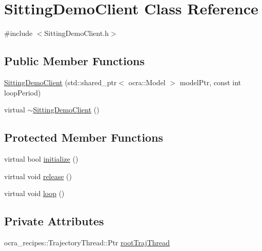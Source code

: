 \hypertarget{classSittingDemoClient}{\section{\-Sitting\-Demo\-Client \-Class \-Reference}
\label{classSittingDemoClient}
}


{\ttfamily \#include $<$\-Sitting\-Demo\-Client.\-h$>$}

\subsection*{\-Public \-Member \-Functions}
\begin{DoxyCompactItemize}
\item 
\hyperlink{classSittingDemoClient_aedcb6c4ad7b4fa19f1b188e700c0a079}{\-Sitting\-Demo\-Client} (std\-::shared\-\_\-ptr$<$ ocra\-::\-Model $>$ model\-Ptr, const int loop\-Period)
\item 
virtual \hyperlink{classSittingDemoClient_a0fb7ded5e44b2b60d7f89c22386154b7}{$\sim$\-Sitting\-Demo\-Client} ()
\end{DoxyCompactItemize}
\subsection*{\-Protected \-Member \-Functions}
\begin{DoxyCompactItemize}
\item 
virtual bool \hyperlink{classSittingDemoClient_aff04405d690f2ae8abbd05ea4b55b64d}{initialize} ()
\item 
virtual void \hyperlink{classSittingDemoClient_a18d30d70a9b17e8f64f87f5cb01b746e}{release} ()
\item 
virtual void \hyperlink{classSittingDemoClient_ad08cf3328c8a4f22a1677b5ad67de645}{loop} ()
\end{DoxyCompactItemize}
\subsection*{\-Private \-Attributes}
\begin{DoxyCompactItemize}
\item 
ocra\-\_\-recipes\-::\-Trajectory\-Thread\-::\-Ptr \hyperlink{classSittingDemoClient_a1d5616269e9a673022542bb86f380bfd}{root\-Traj\-Thread}
\end{DoxyCompactItemize}


